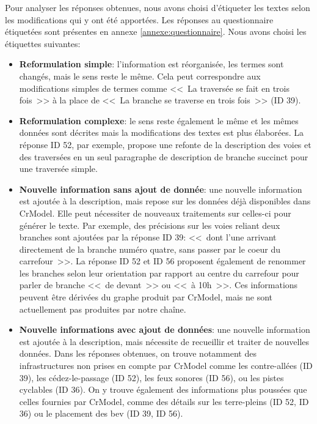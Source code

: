 \newpar{}

\begin{samepage}
    Pour analyser les réponses obtenues, nous avons choisi d'étiqueter les textes selon les modifications qui y ont été apportées. Les réponses au questionnaire étiquetées sont présentes en annexe \ref{annexe:questionnaire}. Nous avons choisi les étiquettes suivantes:

    \begin{itemize}
        \item \textbf{Reformulation simple}: l'information est réorganisée, les termes sont changés, mais le sens reste le même. Cela peut correspondre aux modifications simples de termes comme <<~La traversée se fait en trois fois~>> à la place de <<~La branche se traverse en trois fois~>> (ID 39).
        \item \textbf{Reformulation complexe}: le sens reste également le même et les mêmes données sont décrites mais la modifications des textes est plus élaborées. La réponse ID 52, par exemple, propose une refonte de la description des voies et des traversées en un seul paragraphe de description de branche succinct pour une traversée simple.
        \item \textbf{Nouvelle information sans ajout de donnée}: une nouvelle information est ajoutée à la description, mais repose sur les données déjà disponibles dans CrModel. Elle peut nécessiter de nouveaux traitements sur celles-ci pour générer le texte. Par exemple, des précisions sur les voies reliant deux branches sont ajoutées par la réponse ID 39: <<~dont l’une arrivant directement de la branche numéro quatre, sans passer par le coeur du carrefour~>>. La réponse ID 52 et ID 56 proposent également de renommer les branches selon leur orientation par rapport au centre du carrefour pour parler de branche <<~de devant~>> ou <<~à 10h~>>. Ces informations peuvent être dérivées du graphe produit par CrModel, mais ne sont actuellement pas produites par notre chaîne.
        \item \textbf{Nouvelle informations avec ajout de données}: une nouvelle information est ajoutée à la description, mais nécessite de recueillir et traiter de nouvelles données. Dans les réponses obtenues, on trouve notamment des infrastructures non prises en compte par CrModel comme les contre-allées (ID 39), les cédez-le-passage (ID 52), les feux sonores (ID 56), ou les pistes cyclables (ID 36). On y trouve également des informations plus poussées que celles fournies par CrModel, comme des détails sur les terre-pleins (ID 52, ID 36) ou le placement des \gls{bev} (ID 39, ID 56).
    \end{itemize}
\end{samepage}

